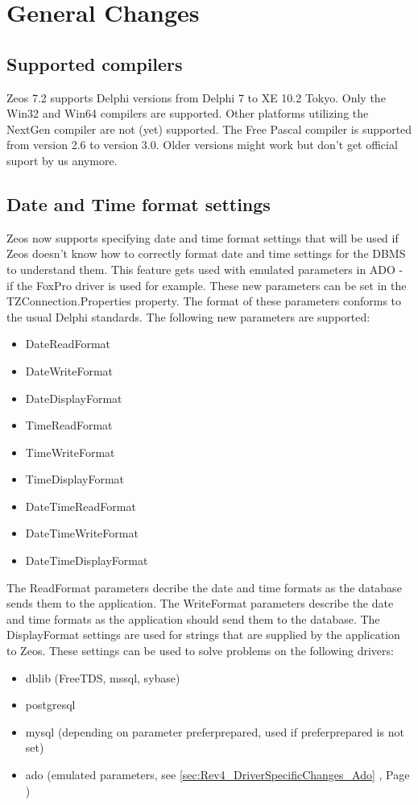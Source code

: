 \documentclass[a4paper,12pt,oneside]{book}
\begin{document}
\section{General Changes}
\label{sec:Rev4_GeneralChanges}
\subsection{Supported compilers}
\label{sec:Rev4_GeneralChanges_SupportedCompilers}
Zeos 7.2 supports Delphi versions from Delphi 7 to XE 10.2 Tokyo.
Only the Win32 and Win64 compilers are supported.
Other platforms utilizing the NextGen compiler are not (yet) supported.
The Free Pascal compiler is supported from version 2.6 to version 3.0.
Older versions might work but don't get official suport by us anymore.

\subsection{Date and Time format settings}
\label{sec:Rev4_GeneralChanges_DateAndTimeFormatSettings}
Zeos now supports specifying date and time format settings that will be used if Zeos doesn't know how to correctly format date and time settings for the DBMS to understand them.
This feature gets used with emulated parameters in ADO - if the FoxPro driver is used for example.
These new parameters can be set in the TZConnection.Properties property.
The format of these parameters conforms to the usual Delphi standards.
The following new parameters are supported:
\begin{itemize}
\item DateReadFormat
\item DateWriteFormat
\item DateDisplayFormat
\item TimeReadFormat
\item TimeWriteFormat
\item TimeDisplayFormat
\item DateTimeReadFormat
\item DateTimeWriteFormat
\item DateTimeDisplayFormat
\end{itemize}
The ReadFormat parameters decribe the date and time formats as the data\-base sends them to the application.
The WriteFormat parameters describe the date and time formats as the application should send them to the database.
The DisplayFormat settings are used for strings that are supplied by the application to Zeos.
These settings can be used to solve problems on the following drivers:
\begin{itemize}
\item dblib (FreeTDS, mssql, sybase)
\item postgresql
\item mysql (depending on parameter preferprepared, used if preferprepared is not set)
\item ado (emulated parameters, see \ref{sec:Rev4_DriverSpecificChanges_Ado} , Page \pageref{sec:Rev4_DriverSpecificChanges_Ado})
\end{itemize}
\end{document}
